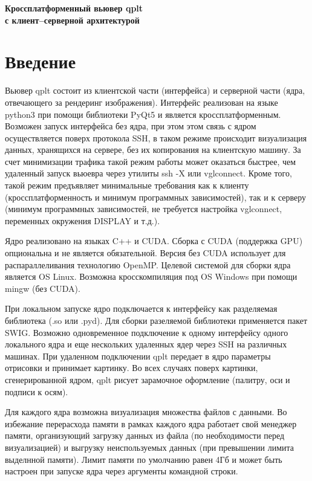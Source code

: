 \documentclass[12pt]{article}
\begin{document}
\begin{center}
  \bf\LARGE Кроссплатформенный вьювер qplt \\ с клиент--серверной архитектурой
\end{center}

\tableofcontents

\section{Введение}
Вьювер qplt  состоит из клиентской части (интерфейса)
и серверной части (ядра, отвечающего за рендеринг изображения). Интерфейс реализован на языке python3 при помощи библиотеки PyQt5 и является кроссплатформенным.
Возможен запуск интерфейса без ядра, при этом этом связь с ядром осуществляется поверх протокола SSH,
в таком режиме происходит визуализация данных, хранящихся на сервере, без их копирования на клиентскую машину.
За счет минимизации трафика такой режим работы может оказаться быстрее, чем удаленный запуск вьюевра через утилиты ssh -X или vglconnect.
Кроме того, такой режим предъявляет минимальные требования как к клиенту (кроссплатформенность и минимум программных зависимостей),
так и к серверу (минимум программных зависимостей, не требуется настройка vglconnect, переменных окружения DISPLAY и т.д.).


Ядро реализовано на языках C++ и CUDA. Сборка с CUDA (поддержка GPU) опциональна и не является обязательной.
Версия без CUDA использует для распараллеливания технологию OpenMP.
Целевой системой для сборки ядра является OS Linux. Возможна кросскомпиляция под OS Windows при помощи mingw (без CUDA).

При локальном запуске ядро подключается к интерфейсу как разделяемая библиотека (.so или .pyd). Для сборки разеляемой библиотеки применяется пакет SWIG. 
Возможно одновременное подключение к одному интерфейсу одного локального ядра и еще нескольких удаленных ядер через  SSH на различных машинах.
При удаленном подключении qplt передает в ядро параметры отрисовки и принимает картинку. Во всех случаях поверх картинки, сгенерированной ядром,
qplt рисует зарамочное оформление (палитру, оси и подписи к осям).


Для каждого ядра возможна визуализация множества файлов с данными. Во избежание перерасхода памяти в рамках каждого ядра работает свой менеджер памяти,
организующий загрузку данных из файла (по необходимости перед визуализацией) и выгрузку неиспользуемых данных (при превышении лимита выделнной памяти). 
Лимит памяти по умолчанию равен 4Гб и может быть настроен при запуске ядра через аргументы командной строки.
\end{document}
